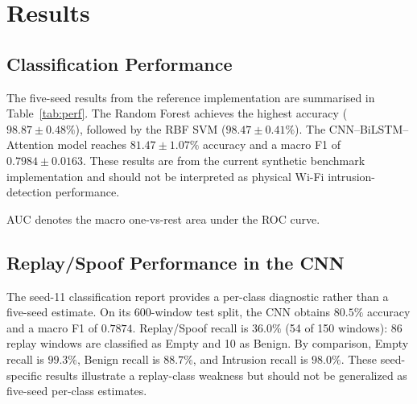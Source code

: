 \documentclass[conference]{IEEEtran}
\begin{document}
\section{Results}
\subsection{Classification Performance}
The five-seed results from the reference implementation are summarised in Table~\ref{tab:perf}. The Random Forest achieves the highest accuracy ($98.87\pm0.48\%$), followed by the RBF SVM ($98.47\pm0.41\%$). The CNN--BiLSTM--Attention model reaches $81.47\pm1.07\%$ accuracy and a macro F1 of $0.7984\pm0.0163$. These results are from the current synthetic benchmark implementation and should not be interpreted as physical Wi-Fi intrusion-detection performance.

\begin{table}[t]
\caption{Classification Performance on the Synthetic Test Split (Mean $\pm$ Standard Deviation over Five Seeds)}
\label{tab:perf}
\centering
\footnotesize
\setlength{\tabcolsep}{2pt}
\par\smallskip
\footnotesize AUC denotes the macro one-vs-rest area under the ROC curve.
\end{table}

\subsection{Replay/Spoof Performance in the CNN}
The seed-11 classification report provides a per-class diagnostic rather than a five-seed estimate. On its 600-window test split, the CNN obtains $80.5\%$ accuracy and a macro F1 of $0.7874$. Replay/Spoof recall is $36.0\%$ (54 of 150 windows): 86 replay windows are classified as Empty and 10 as Benign. By comparison, Empty recall is $99.3\%$, Benign recall is $88.7\%$, and Intrusion recall is $98.0\%$. These seed-specific results illustrate a replay-class weakness but should not be generalized as five-seed per-class estimates.
\end{document}
